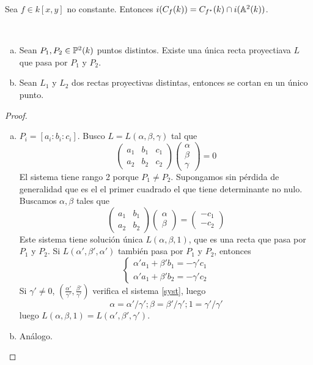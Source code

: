 \documentclass[CR.tex]{subfiles}
\begin{document}
\begin{lemma}
Sea $f\in k[x,y]$ no constante. Entonces $i(C_f(k))=C_{f^*}(k)\cap i(\mathbb{A}^2(k))$. 
\end{lemma}

\begin{lemma}\
\begin{enumerate}[(a)]
\item Sean $P_1,P_2\in\mathbb{P}^2(k)$ puntos distintos. Existe una única recta proyectiava $L$ que pasa por $P_1$ y $P_2$. 
\item Sean $L_1$ y $L_2$ dos rectas proyectivas distintas, entonces se cortan en un único punto. 
\end{enumerate}
\end{lemma}
\begin{proof}\
\begin{enumerate}[(a)]
\item $P_i=[a_i:b_i:c_i]$. Busco $L=L(\alpha,\beta,\gamma)$ tal que 
\[
\begin{pmatrix}
a_1 & b_1 & c_1\\
a_2 & b_2 & c_2
\end{pmatrix}\begin{pmatrix}
\alpha\\
\beta\\
\gamma
\end{pmatrix}=0
\]
El sistema tiene rango 2 porque $P_1\neq P_2$. Supongamos sin pérdida de generalidad que es el el primer cuadrado el que tiene determinante no nulo. Buscamos $\alpha,\beta$ tales que
\begin{equation}\label{syst}
\begin{pmatrix}
a_1 & b_1\\
a_2 & b_2
\end{pmatrix}\begin{pmatrix}
\alpha\\
\beta
\end{pmatrix}=\begin{pmatrix}
-c_1\\
-c_2
\end{pmatrix}
\end{equation}
Este sistema tiene solución única $L(\alpha,\beta,1)$, que es una recta que pasa por $P_1$ y $P_2$. Si $L(\alpha',\beta',\alpha')$ también pasa por $P_1$ y $P_2$, entonces
\[
\begin{cases}
\alpha'a_1+\beta'b_1=-\gamma'c_1\\
\alpha'a_1+\beta'b_2=-\gamma'c_2
\end{cases}
\]
Si $\gamma'\neq 0$, $(\frac{\alpha'}{\gamma'},\frac{\beta'}{\gamma'})$ verifica el sistema \ref{syst}, luego
\[
\alpha=\alpha'/\gamma'; \beta=\beta'/\gamma'; 1=\gamma'/\gamma'
\]
luego $L(\alpha,\beta,1)=L(\alpha',\beta',\gamma')$.

\item Análogo.
\end{enumerate}
\end{proof}
\end{document}
